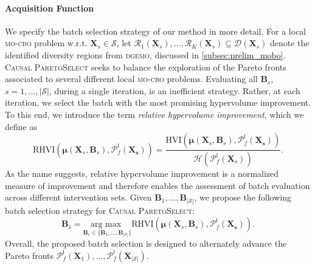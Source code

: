 \paragraph{Acquisition Function} 
We specify the batch selection strategy of our method in more detail. For a local \textsc{mo-cbo} problem w.r.t. $\mathbf{X}_s \in \mathcal{S}$, let $\mathcal{R}_1(\mathbf{X}_s),\dots,\mathcal{R}_K(\mathbf{X}_s) \subseteq \mathcal{D}(\mathbf{X}_s)$ denote the identified diversity regions from \textsc{dgemo}, discussed in \cref{subsec:prelim_mobo}. \textsc{Causal ParetoSelect} seeks to balance the exploration of the Pareto fronts associated to several different local \textsc{mo-cbo} problems. Evaluating all $\mathbf{B}_s$, $s=1,\dots,|\mathcal{S}|$, during a single iteration, is an inefficient strategy. Rather, at each iteration, we select the batch with the most promising hypervolume improvement. 
To this end, we introduce the term  \textit{relative hypervolume improvement}, which we define as
\begin{equation}
    \text{RHVI}(\boldsymbol{\mu}(\mathbf{X}_s,\mathbf{B}_s), \mathcal{P}_f^{\textsf{l}}(\mathbf{X_s})) = \frac{\text{HVI}(\boldsymbol{\mu}(\mathbf{X}_s,\mathbf{B}_s), \mathcal{P}^{{\textsf{l}}}_f(\mathbf{X_s}))}{\mathcal{H}(\mathcal{P}^{\textsf{l}}_f(\mathbf{X}_s))}.
\end{equation}
As the name suggests, relative hypervolume improvement is a normalized measure of improvement and therefore enables the assessment of batch evaluation across different intervention sets.
Given $\mathbf{B}_1,\dots,\mathbf{B}_{|\mathcal{S}|}$, we propose the following batch selection strategy for \textsc{Causal ParetoSelect}:
\begin{equation}\label{eq:mo_cbo.batch_selection}
    \mathbf{B}_{\hat{s}}= \underset{ \mathbf{B}_s \in \{\mathbf{B}_1,\dots,\mathbf{B}_{{|\mathcal{S}|}}\}}{\text{arg max }} \text{RHVI} (\boldsymbol{\mu}(\mathbf{X}_s,\mathbf{B}_s), \mathcal{P}_f^{\textsf{l}}(\mathbf{X_s})).
\end{equation}
Overall, the proposed batch selection is designed to alternately advance the Pareto fronts $\mathcal{P}_f^{\textsf{l}}(\mathbf{X}_1),\dots,\mathcal{P}_f^{\textsf{l}}(\mathbf{X}_{|\mathcal{S}|})$.
